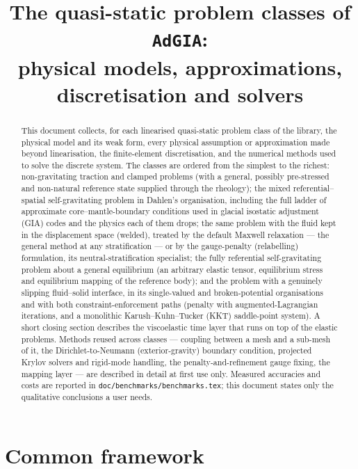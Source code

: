 \documentclass[11pt]{article}
\title{The quasi-static problem classes of \texttt{AdGIA}:\\
       physical models, approximations, discretisation and solvers}
\author{}
\date{}
\numberwithin{equation}{section}
\theoremstyle{remark}
\newcommand{\code}[1]{\texttt{#1}}
\begin{document}
\maketitle

\begin{abstract}
\noindent
This document collects, for each linearised quasi-static problem class of
the library, the physical model and its weak form, every physical
assumption or approximation made beyond linearisation, the finite-element
discretisation, and the numerical methods used to solve the discrete
system. The classes are ordered from the simplest to the richest:
non-gravitating traction and clamped problems (with a general, possibly
pre-stressed and non-natural reference state supplied through the
rheology); the mixed referential--spatial self-gravitating problem in
Dahlen's organisation, including the full ladder of approximate
core--mantle-boundary conditions used in glacial isostatic adjustment
(GIA) codes and the physics each of them drops; the same problem with the
fluid kept in the displacement space (welded), treated by the default
Maxwell relaxation --- the general method at any stratification --- or by
the gauge-penalty (relabelling) formulation, its neutral-stratification
specialist; the fully
referential self-gravitating problem about a general equilibrium
(an arbitrary elastic tensor, equilibrium stress and equilibrium mapping
of the reference body); and the problem with a genuinely slipping
fluid--solid interface, in its single-valued and broken-potential
organisations and with both constraint-enforcement paths
(penalty with augmented-Lagrangian iterations, and a monolithic
Karush--Kuhn--Tucker (KKT) saddle-point system). A short closing section describes the viscoelastic time layer
that runs on top of the elastic problems. Methods reused across classes
--- coupling between a mesh and a sub-mesh of it, the
Dirichlet-to-Neumann (exterior-gravity) boundary condition, projected
Krylov solvers and rigid-mode handling, the penalty-and-refinement gauge
fixing, the mapping layer --- are described in detail at first use only.
Measured accuracies and costs are reported in \code{doc/benchmarks/benchmarks.tex};
this document states only the qualitative conclusions a user needs.
\end{abstract}

\tableofcontents

\section{Common framework}
\label{sec:common}
\end{document}
